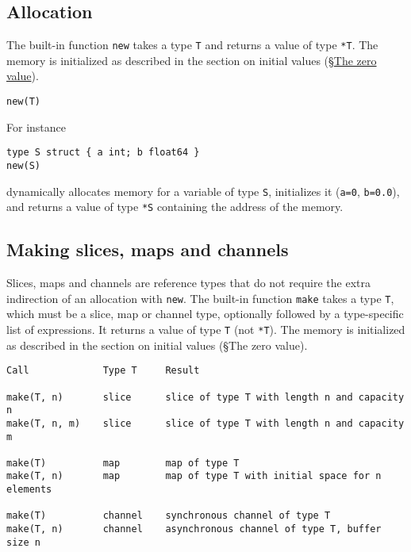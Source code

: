 {\subsection*{Allocation}

The built-in function \texttt{new} takes a type \texttt{T} and returns a
value of type \texttt{*T}. The memory is initialized as described in the
section on initial values (§\hyperref[The\_zero\_value]{The zero
value}).

\begin{Verbatim}[frame=single]
new(T)
\end{Verbatim}

For instance

\begin{Verbatim}[frame=single]
type S struct { a int; b float64 }
new(S)
\end{Verbatim}

dynamically allocates memory for a variable of type \texttt{S},
initializes it (\texttt{a=0}, \texttt{b=0.0}), and returns a value of
type \texttt{*S} containing the address of the memory.

\subsection*{Making slices, maps and channels}

Slices, maps and channels are reference types that do not require the
extra indirection of an allocation with \texttt{new}. The built-in
function \texttt{make} takes a type \texttt{T}, which must be a slice,
map or channel type, optionally followed by a type-specific list of
expressions. It returns a value of type \texttt{T} (not \texttt{*T}).
The memory is initialized as described in the section on initial values
(§The zero value).

\begin{Verbatim}[frame=single]
Call             Type T     Result

make(T, n)       slice      slice of type T with length n and capacity n
make(T, n, m)    slice      slice of type T with length n and capacity m

make(T)          map        map of type T
make(T, n)       map        map of type T with initial space for n elements

make(T)          channel    synchronous channel of type T
make(T, n)       channel    asynchronous channel of type T, buffer size n
\end{Verbatim}

}
